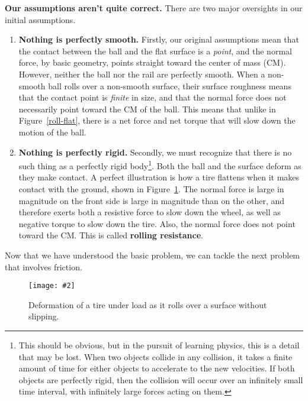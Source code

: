 \documentclass{../../oss-handout}
\newcommand{\pic}[2]{\texttt{[image: \#2]}}
\begin{document}
\textbf{Our assumptions aren't quite correct.} There are two major oversights
in our initial assumptions.
\begin{enumerate}
\item\textbf{Nothing is perfectly smooth.} Firstly, our original assumptions
  mean that the contact between the ball and the flat surface is a \emph{point},
  and the normal force, by basic geometry, points straight toward the center of
  mass (CM). However, neither the ball nor the rail are perfectly smooth. When
  a non-smooth ball rolls over a non-smooth surface, their surface roughness
  means that the contact point is \emph{finite} in size, and that the normal
  force does not necessarily point toward the CM of the ball. This means that
  unlike in Figure~\ref{roll-flat}, there is a net force and net torque that
  will slow down the motion of the ball.
\item\textbf{Nothing is perfectly rigid.} Secondly, we must recognize that
  there is no such thing as a perfectly rigid body\footnote{This should be
    obvious, but in the pursuit of learning physics, this is a detail that may
    be lost. When two objects collide in any collision, it takes a finite
    amount of time for either objects to accelerate to the new velocities. If
    both objects are perfectly rigid, then the collision will occur over an
    infinitely small time interval, with infinitely large forces acting on
    them.}. Both the ball and the surface deform as they make contact. A
  perfect illustration is how a tire flattens when it makes contact with the
  ground, shown in Figure~\ref{tire1}. The normal force is large in magnitude on
  the front side is large in magnitude than on the other, and therefore exerts
  both a resistive force to slow down the wheel, as well as negative torque to
  slow down the tire. Also, the normal force does not point toward the CM. This
  is called \textbf{rolling resistance}.
\end{enumerate}  
Now that we have understood the basic problem, we can tackle the next problem
that involves friction.
\begin{figure}[!ht]
  \centering
  \pic{.3}{../OAGZy}
  \caption{Deformation of a tire under load as it rolls over a surface
    without slipping.}
  \label{tire1}
\end{figure}
\end{document}
